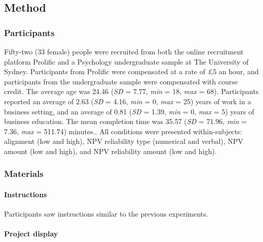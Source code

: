 \documentclass[a4paper, nobind, dvipsnames]{templates/ociamthesis}
\theoremstyle{definition}
\theoremstyle{definition}
\theoremstyle{definition}
\theoremstyle{definition}
\theoremstyle{remark}
\begin{document}
\hypertarget{method-16}{%
\subsection{Method}\label{method-16}}

\hypertarget{participants-16}{%
\subsubsection{Participants}\label{participants-16}}

Fifty-two (33 female) people were recruited from both the online recruitment platform Prolific and a Psychology undergraduate sample at The University of Sydney. Participants from Prolific were compensated at a rate of £5 an hour, and participants from the undergraduate sample were compensated with course credit. The average age was 24.46 (\emph{SD} = 7.77, \emph{min} = 18, \emph{max} = 68). Participants reported an average of 2.63 (\emph{SD} = 4.16, \emph{min} = 0, \emph{max} = 25) years of work in a business setting, and an average of 0.81 (\emph{SD} = 1.39, \emph{min} = 0, \emph{max} = 5) years of business education. The mean completion time was 35.57 (\emph{SD} = 71.96, \emph{min} = 7.36, \emph{max} = 511.74) minutes.. All conditions were presented within-subjects:
alignment (low and high), NPV reliability type (numerical and verbal), NPV
amount (low and high), and NPV reliability amount (low and high).

\hypertarget{materials-16}{%
\subsubsection{Materials}\label{materials-16}}

\hypertarget{instructions-9}{%
\paragraph{Instructions}\label{instructions-9}}

Participants saw instructions similar to the previous experiments.

\hypertarget{project-display-2}{%
\paragraph{Project display}\label{project-display-2}}
\end{document}

